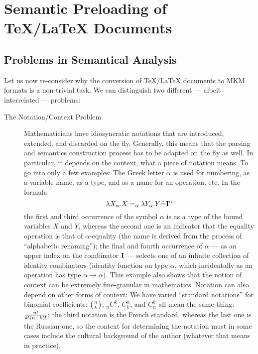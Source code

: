 \section{Semantic Preloading of {\TeX}/{\LaTeX} Documents}\label{sec:preloading}

\subsection{Problems in Semantical Analysis}

Let us now re-consider why the conversion of {\TeX/\LaTeX} documents to MKM formats is a
non-trivial task. We can distinguish two different --- albeit interrelated --- problems:

\begin{description}
\item[The Notation/Context Problem] Mathematicians have idiosyncratic notations
  that are introduced, extended, and discarded on the fly. Generally, this means
  that the parsing and semantics construction process has to be adapted on the fly
  as well. In particular, it depends on the context, what a piece of notation
  means. To go into only a few examples: The Greek letter $\alpha$ is used for
  numbering, as a variable name, as a type, and as a name for an operation, etc.
  In the formula
  \begin{equation}\label{alphaeq}
    \lambda{X_\alpha}.X=_\alpha\lambda{Y_\alpha}.Y\hat=\bf{I}^\alpha
  \end{equation}
  the first and third occurrence of the symbol $\alpha$ is as a type of the bound
  variables $X$ and $Y$, whereas the second one is an indicator that the equality
  operation is that of $\alpha$-equality (the name is derived from the process of
  ``alphabetic renaming''); the final and fourth occurrence of $\alpha$ --- as an
  upper index on the combinator $\bf I$ --- selects one of an infinite collection
  of identity combinators (identity function on type $\alpha$, which incidentally
  as an operation has type $\alpha\to\alpha$). This example also shows that the
  notion of context can be extremely fine-granular in mathematics. Notation can
  also depend on other forms of context: We have varied ``standard notations'' for
  binomial coefficients: $\left(n\atop k\right)$, $_nC^k$, $C^n_k$, and $C^k_n$
  all mean the same thing: $n!\over k!(n-k)!$; the third notation is the French
  standard, whereas the last one is the Russian one, so the context for
  determining the notation must in some cases include the cultural background of
  the author (whatever that means in practice).
  

\end{description}

